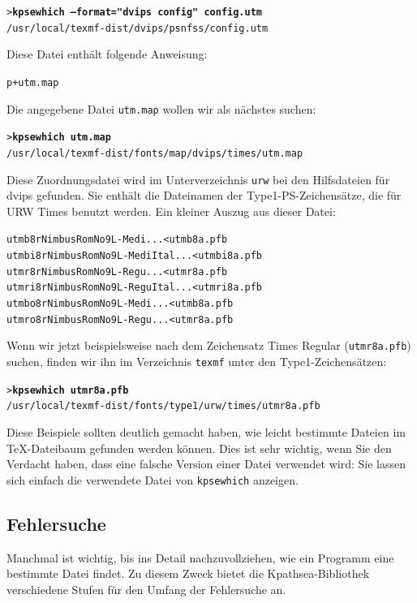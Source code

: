 \documentclass[12pt,ngerman,a4paper,fullparskip]{scrreprt}
\newcommand{\cmdname}[1]{\texttt{#1}}
\newcommand{\OnCD}[1]{\texttt{#1}}
\newcommand{\file}[1]{\texttt{#1}}
\newcommand{\KPS}{Kpathsea\xspace}
\newcommand{\Ucom}[1]{\textbf{\texttt{#1}}}
\begin{document}
\begin{alltt}
> \Ucom{kpsewhich --format="dvips config" config.utm}
   /usr/local/texmf-dist/dvips/psnfss/config.utm
\end{alltt}

Diese Datei enthält folgende Anweisung:

\begin{alltt}
   p +utm.map
\end{alltt}

Die angegebene Datei \file{utm.map} wollen wir als nächstes suchen:

\begin{alltt}
> \Ucom{kpsewhich utm.map}
   /usr/local/texmf-dist/fonts/map/dvips/times/utm.map
\end{alltt}

Diese Zuordnungsdatei wird im Unterverzeichnis \file{urw} bei den
Hilfsdateien für dvips gefunden. Sie enthält die Dateinamen der
Type1-PS-Zeichensätze, die für URW Times benutzt werden. Ein
kleiner Auszug aus dieser Datei:

\begin{alltt}
  utmb8r  NimbusRomNo9L-Medi    ... <utmb8a.pfb
  utmbi8r NimbusRomNo9L-MediItal... <utmbi8a.pfb
  utmr8r  NimbusRomNo9L-Regu    ... <utmr8a.pfb
  utmri8r NimbusRomNo9L-ReguItal... <utmri8a.pfb
  utmbo8r NimbusRomNo9L-Medi    ... <utmb8a.pfb
  utmro8r NimbusRomNo9L-Regu    ... <utmr8a.pfb
\end{alltt}

Wenn wir jetzt beispielsweise nach dem Zeichensatz Times Regular
(\file{utmr8a.pfb}) suchen, finden wir ihn im
Verzeichnis \OnCD{texmf} unter den Type1-Zeichensätzen:

\begin{alltt}
> \Ucom{kpsewhich utmr8a.pfb}
 /usr/local/texmf-dist/fonts/type1/urw/times/utmr8a.pfb
\end{alltt}

Diese Beispiele sollten deutlich gemacht haben, wie leicht bestimmte Dateien
im \TeX-Dateibaum gefunden werden können. Dies ist sehr wichtig, wenn Sie
den Verdacht haben, dass eine falsche Version einer Datei verwendet wird:
Sie lassen sich einfach die verwendete Datei von \cmdname{kpsewhich}
anzeigen.

\subsection{Fehlersuche}
\label{sec:debugging}

Manchmal ist wichtig, bis ins Detail nachzuvollziehen, wie ein Programm eine
bestimmte Datei findet. Zu diesem Zweck bietet die \KPS-Bibliothek verschiedene
Stufen für den Umfang der Fehlersuche an.
\end{document}
